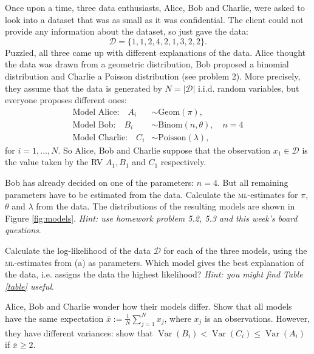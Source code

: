 \documentclass[a4paper,10pt,landscape,twocolumn]{scrartcl}
\DeclareMathOperator{\Var}{Var}
\begin{document}
\begin{exercise}
Once upon a time, three data enthusiasts, Alice, Bob and Charlie, were asked to look into a dataset that was as small as it was confidential. The client could not provide any information about the dataset, so just gave the data:
	\[
		\mathcal{D} = \{ 1, 1, 2, 4, 2, 1, 3, 2, 2 \}.
	\]
	Puzzled, all three came up with different explanations of the data. Alice thought the data was drawn from a geometric distribution, Bob proposed a binomial distribution and Charlie a Poisson distribution (see problem 2). More precisely, they assume that the data is generated by $N = |\mathcal D|$ i.i.d. random variables, but everyone proposes different ones:
	\begin{align}
		\text{Model Alice:} \quad A_i &\sim \text{Geom}(\pi),\\
		\text{Model Bob:} \quad B_i &\sim \text{Binom}(n, \theta), \quad n=4\\
		\text{Model Charlie:} \quad C_i &\sim \text{Poisson}(\lambda),
	\end{align}
	for $i = 1, \dots, N$. So Alice, Bob and Charlie suppose that the observation $x_1 \in \mathcal D$ is the value taken by the RV $A_1, B_1$ and $C_1$ respectively.
	
	\begin{subex}[0.5pt]
	Bob has already decided on one of the parameters: $n=4$. But all remaining parameters have to be estimated from the data. Calculate the \textsc{ml}-estimates for $\pi$, $\theta$ and $\lambda$ from the data. The distributions of the resulting models are shown in Figure \ref{fig:models}. 
	\emph{Hint: use homework problem 5.2, 5.3 and this week's board questions}.
	\end{subex}
	
	\begin{subex}[0.5pt]
		Calculate the log-likelihood of the data $\mathcal D$ for each of the three models, using the \textsc{ml}-estimates from (a) as parameters. Which model gives the best explanation of the data, i.e. assigns the data the highest likelihood? \emph{Hint: you might find Table \ref{table} useful}.
	\end{subex}
	
	\begin{subex}[1pt]
		Alice, Bob and Charlie wonder how their models differ. Show that all models have the same expectation $\overline x := \frac{1}{N} \sum_{j=1}^N x_j$, where $x_j$ is an observations. However, they have different variances: show that $\Var(B_i) < \Var(C_i) \le \Var(A_i)$ if $\overline x \ge 2$.
	\end{subex}
	

\end{exercise}
\end{document}
